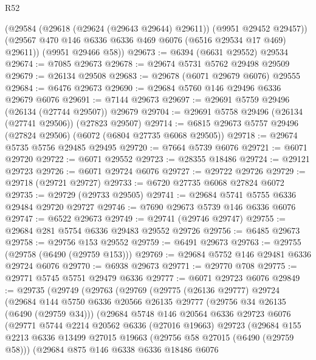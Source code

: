\begin{lexlean}{R52}
\begin{coremodule}
        (@29584 (@29618 (@29624 (@29643 @29644) @29611)) (@9951 @29452 @29457))
        (@29567 @470 @146 @6336 @6336 @469 @6076 (@6516 @29534 @17 @469) @29611))
      (@9951 @29466 @58))
@29673 := @6394 (@6631 @29552) @29534
@29674 := @7085 @29673
@29678 := @29674 @5731 @5762 @29498 @29509
@29679 := @26134 @29508
@29683 := @29678 (@6071 @29679 @6076) @29555
@29684 := @6476 @29673
@29690 := @29684 @5760 @146 @29496 @6336 @29679 @6076
@29691 := @7144 @29673
@29697 := @29691 @5759 @29496 (@26134 (@27744 @29507)) @29679
@29704 := @29691 @5758 @29496 (@26134 (@27741 @29506)) (@27823 @29507)
@29714 := @6815 @29673 @5757 @29496 (@27824 @29506) (@6072 (@6804 @27735 @6068 @29505))
@29718 := @29674 @5735 @5756 @29485 @29495
@29720 := @7664 @5739 @6076
@29721 := @6071 @29720
@29722 := @6071 @29552
@29723 := @28355 @18486
@29724 := @29121 @29723
@29726 := @6071 @29724 @6076
@29727 := @29722 @29726
@29729 := @29718 (@29721 @29727)
@29733 := @6720 @27735 @6068 @27824 @6072
@29735 := @29729 (@29733 @29505)
@29741 := @29684 @5741 @5755 @6336 @29484 @29720 @29727
@29746 := @7690 @29673 @5739 @146 @6336 @6076
@29747 := @6522 @29673
@29749 := @29741 (@29746 @29747)
@29755 := @29684 @281 @5754 @6336 @29483 @29552 @29726
@29756 := @6485 @29673
@29758 := @29756 @153 @29552
@29759 := @6491 @29673
@29763 := @29755 (@29758 (@6490 (@29759 @153)))
@29769 := @29684 @5752 @146 @29481 @6336 @29724 @6076
@29770 := @6938 @29673
@29771 := @29770 @708
@29775 := @29771 @5745 @5751 @29479 @6336
@29777 := @6071 @29723 @6076
@29849 := @29735
    (@29749
      (@29763
        (@29769
          (@29775
            (@26136 @29777)
            @29724
            (@29684
              @144
              @5750
              @6336
              @20566
              @26135
              @29777
              (@29756 @34 @26135 (@6490 (@29759 @34)))
              (@29684
                @5748
                @146
                @20564
                @6336
                @29723
                @6076
                (@29771
                  @5744
                  @2214
                  @20562
                  @6336
                  (@27016 @19663)
                  @29723
                  (@29684
                    @155
                    @2213
                    @6336
                    @13499
                    @27015
                    @19663
                    (@29756 @58 @27015 (@6490 (@29759 @58)))
                    (@29684
                      @875
                      @146
                      @6338
                      @6336
                      @18486
                      @6076

\end{coremodule}
\end{lexlean}
